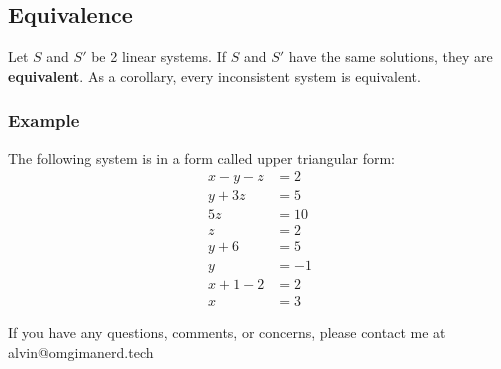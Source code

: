 \documentclass[letterpaper, 12pt]{math}
\begin{document}
\subsection*{Equivalence}
Let \( S \) and \( S' \) be 2 linear systems. If \( S \) and \( S' \) have the
same solutions, they are \textbf{equivalent}. As a corollary, every inconsistent
system is equivalent.

\subsubsection*{Example}
The following system is in a form called upper triangular form:
\begin{align*}
  x-y-z &= 2 \\
  y+3z &= 5 \\
  5z &= 10 \\
  z &= 2 \\
  y+6 &= 5 \\
  y &= -1 \\
  x+1-2 &= 2 \\
  x &= 3
\end{align*}

\begin{center}
  If you have any questions, comments, or concerns, please contact me at
  alvin@omgimanerd.tech
\end{center}
\end{document}
